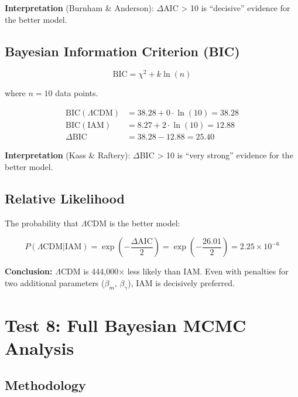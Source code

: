 \documentclass[11pt,letterpaper]{article}
\begin{document}
\noindent\textbf{Interpretation} (Burnham \& Anderson): $\Delta$AIC > 10 is ``decisive'' evidence for the better model.

\subsection{Bayesian Information Criterion (BIC)}

\begin{equation}
\text{BIC} = \chi^2 + k \ln(n)
\end{equation}

where $n = 10$ data points.

\begin{align*}
\text{BIC}(\Lambda\text{CDM}) &= 38.28 + 0 \cdot \ln(10) = 38.28 \\
\text{BIC}(\text{IAM}) &= 8.27 + 2 \cdot \ln(10) = 12.88 \\
\Delta\text{BIC} &= 38.28 - 12.88 = 25.40
\end{align*}

\noindent\textbf{Interpretation} (Kass \& Raftery): $\Delta$BIC > 10 is ``very strong'' evidence for the better model.

\subsection{Relative Likelihood}

The probability that $\Lambda$CDM is the better model:

\begin{equation}
P(\Lambda\text{CDM} | \text{IAM}) = \exp\left(-\frac{\Delta\text{AIC}}{2}\right) = \exp\left(-\frac{26.01}{2}\right) = 2.25 \times 10^{-6}
\end{equation}

\noindent\textbf{Conclusion:} $\Lambda$CDM is 444,000$\times$ less likely than IAM. Even with penalties for two additional parameters ($\beta_m$, $\beta_\gamma$), IAM is decisively preferred.

\section{Test 8: Full Bayesian MCMC Analysis}

\subsection{Methodology}
\end{document}
